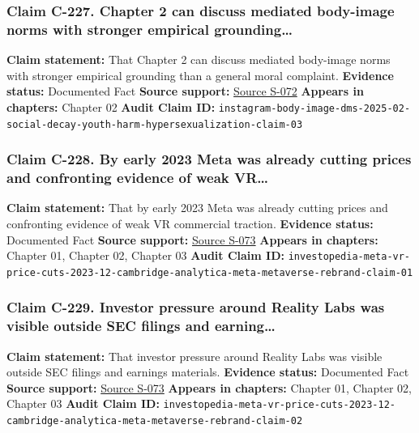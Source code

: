 \documentclass[
  american,
  11pt,
  letterpaper,
]{article}
\begin{document}
\subsubsection{Claim C-227. Chapter 2 can discuss mediated body-image
norms with stronger empirical
grounding\ldots{}}\label{claim-c-227-chapter-2-can-discuss-mediated-body-image-norms-with-stronger-empirical-grounding}

\textbf{Claim statement:} That Chapter 2 can discuss mediated body-image
norms with stronger empirical grounding than a general moral complaint.
\textbf{Evidence status:} Documented Fact \textbf{Source support:}
\hyperref[source-s-072-unfiltered-how-teens-engage-in-body-image-and-shaming-discussions-via-instagram-direct-messages-dms]{Source
S-072} \textbf{Appears in chapters:} Chapter 02 \textbf{Audit Claim ID:}
\texttt{instagram-body-image-dms-2025-02-social-decay-youth-harm-hypersexualization-claim-03}

\subsubsection{Claim C-228. By early 2023 Meta was already cutting
prices and confronting evidence of weak
VR\ldots{}}\label{claim-c-228-by-early-2023-meta-was-already-cutting-prices-and-confronting-evidence-of-weak-vr}

\textbf{Claim statement:} That by early 2023 Meta was already cutting
prices and confronting evidence of weak VR commercial traction.
\textbf{Evidence status:} Documented Fact \textbf{Source support:}
\hyperref[source-s-073-meta-slashes-prices-for-vr-headsets]{Source
S-073} \textbf{Appears in chapters:} Chapter 01, Chapter 02, Chapter 03
\textbf{Audit Claim ID:}
\texttt{investopedia-meta-vr-price-cuts-2023-12-cambridge-analytica-meta-metaverse-rebrand-claim-01}

\subsubsection{Claim C-229. Investor pressure around Reality Labs was
visible outside SEC filings and
earning\ldots{}}\label{claim-c-229-investor-pressure-around-reality-labs-was-visible-outside-sec-filings-and-earning}

\textbf{Claim statement:} That investor pressure around Reality Labs was
visible outside SEC filings and earnings materials. \textbf{Evidence
status:} Documented Fact \textbf{Source support:}
\hyperref[source-s-073-meta-slashes-prices-for-vr-headsets]{Source
S-073} \textbf{Appears in chapters:} Chapter 01, Chapter 02, Chapter 03
\textbf{Audit Claim ID:}
\texttt{investopedia-meta-vr-price-cuts-2023-12-cambridge-analytica-meta-metaverse-rebrand-claim-02}
\end{document}
